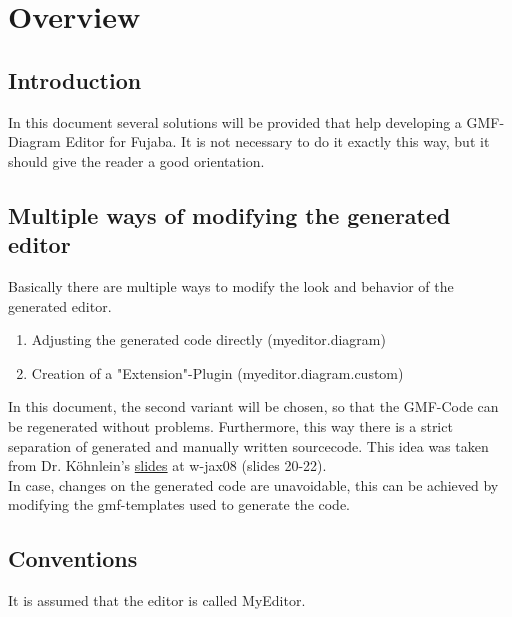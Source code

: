 \documentclass[12pt,a4paper,twoside,titlepage,headsepline,pointlessnumbers,liststotoc,idxtotoc,bibtotoc,ngerman,english]{scrartcl}
\begin{document}
	\setcounter{page}{1}
	
\section{Overview}
\subsection{Introduction}
In this document several solutions will be provided that help developing a
GMF-Diagram Editor for Fujaba.
It is not necessary to do it exactly this way, but it should give the reader a
good orientation.

\subsection{Multiple ways of modifying the generated editor}
Basically there are multiple ways to modify the look and behavior of the
generated editor.
\begin{enumerate}
    \item Adjusting the generated code directly (myeditor.diagram)
	\item Creation of a "Extension"-Plugin (myeditor.diagram.custom)
\end{enumerate}

In this document, the second variant will be chosen, so that the GMF-Code can be
regenerated without problems. Furthermore, this way there is a strict separation
of generated and manually written sourcecode. This idea was taken from Dr. Köhnlein's
\href{http://www.slideshare.net/itemis/gmf-fr-anspruchsvolle-presentation}{slides}
at w-jax08 (slides 20-22). \\
In case, changes on the generated code are unavoidable, this can be achieved by
modifying the gmf-templates used to generate the code.


\subsection{Conventions}
It is assumed that the editor is called MyEditor. 




\end{document}
